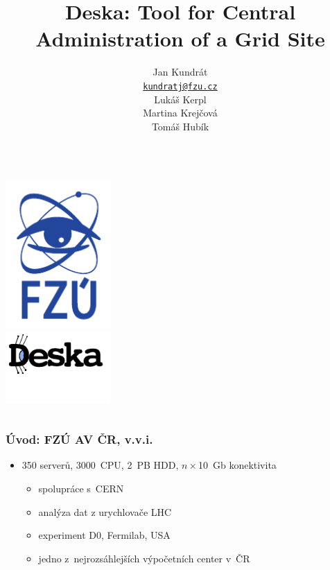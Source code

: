 \documentclass{beamer}
\begin{document}
\title{Deska: Tool for Central Administration of a Grid Site}
\author{Jan Kundrát \\ \href{mailto:kundratj@fzu.cz}{\nolinkurl{kundratj@fzu.cz}}
\vspace{5mm}
\\ Lukáš Kerpl \\ Martina Krejčová \\ Tomáš Hubík}
\begin{frame}
\begin{columns}
\begin{column}{.4\textwidth}
\includegraphics[width=4cm]{../HEPIX-2011/logo-FZU-male.pdf} \\
\includegraphics[width=4cm]{../HEPIX-2011/deska_logo.pdf}
\end{column}
\begin{column}{.6\textwidth}
\maketitle
\end{column}
\end{columns}
\end{frame}


\begin{frame}[fragile]
\frametitle{Úvod: FZÚ AV ČR, v.v.i.}
\begin{itemize}
    \item 350 serverů, 3000~CPU, 2~PB HDD, $n\times$10~Gb konektivita
        \begin{itemize}
            \item spolupráce s~CERN
            \item analýza dat z urychlovače LHC
            \item experiment D0, Fermilab, USA
            \item jedno z~nejrozsáhlejších výpočetních center v~ČR
        \end{itemize}
\end{itemize}
\end{frame}
\end{document}
